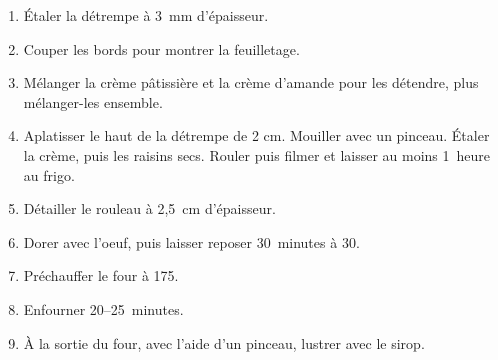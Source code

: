 \begin{recipe}
  \begin{enumerate}
  \item Étaler la détrempe à 3~mm d'épaisseur.

  \item Couper les bords pour montrer la feuilletage.

  \item Mélanger la crème pâtissière et la crème d'amande pour les
    détendre, plus mélanger-les ensemble.

  \item Aplatisser le haut de la détrempe de 2 cm.  Mouiller avec un
    pinceau.  Étaler la crème, puis les raisins secs.  Rouler puis
    filmer et laisser au moins 1~heure au frigo.

  \item Détailler le rouleau à 2,5~cm d'épaisseur.

  \item Dorer avec l'oeuf, puis laisser reposer 30~minutes à 30\degreeC{}.

  \item Préchauffer le four à 175\degreeC{}.

  \item Enfourner 20--25~minutes.

  \item À la sortie du four, avec l'aide d'un pinceau, lustrer avec le sirop.

  \end{enumerate}
\end{recipe}


